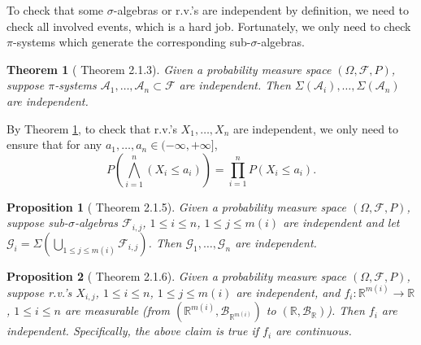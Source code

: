 \documentclass[openany]{book}
\newtheorem{proposition}{Proposition}[chapter]
\newtheorem{theorem}{Theorem}[chapter]
\theoremstyle{definition}
\theoremstyle{remark}
\begin{document}
To check that some $\sigma$-algebras or r.v.'s are independent by definition, we need to check all involved events, which is a hard job. Fortunately, we only need to check $\pi$-systems which generate the corresponding sub-$\sigma$-algebras.
\begin{theorem}[\cite{D10} Theorem 2.1.3]\label{thm:indepPiSystems}
    Given a probability measure space $(\Omega,\mathcal{F},P)$, suppose $\pi$-systems $\mathcal{A}_1,\ldots,\mathcal{A}_n\subset \mathcal{F}$ are independent. Then $\Sigma(\mathcal{A}_i),\ldots,\Sigma(\mathcal{A}_n)$ are independent.
\end{theorem}
By Theorem \ref{thm:indepPiSystems}, to check that r.v.'s $X_1,\ldots,X_n$ are independent, we only need to ensure that for any $a_1,\ldots,a_n\in(-\infty,+\infty]$,
\begin{equation*}
    P\left(\bigwedge_{i=1}^n(X_i\le a_i)\right)=\prod_{i=1}^n P(X_i\le a_i).
\end{equation*}
\begin{proposition}[\cite{D10} Theorem 2.1.5]
    Given a probability measure space $(\Omega,\mathcal{F},P)$, suppose sub-$\sigma$-algebras $\mathcal{F}_{i,j}$, $1\le i\le n$, $1\le j\le m(i)$ are independent and let $\mathcal{G}_i=\Sigma\left(\bigcup_{1\le j\le m(i)} \mathcal{F}_{i,j}\right)$. Then $\mathcal{G}_1,\ldots,\mathcal{G}_n$ are independent.
\end{proposition}
\begin{proposition}[\cite{D10} Theorem 2.1.6]
    Given a probability measure space $(\Omega,\mathcal{F},P)$, suppose r.v.'s $X_{i,j}$, $1\le i\le n$, $1\le j\le m(i)$ are independent, and $f_i:\mathbb{R}^{m(i)}\to \mathbb{R}$, $1\le i\le n$ are measurable (from $(\mathbb{R}^{m(i)},\mathcal{B}_{\mathbb{R}^{m(i)}})$ to $(\mathbb{R},\mathcal{B}_{\mathbb{R}})$). Then $f_i$ are independent. Specifically, the above claim is true if $f_i$ are continuous.
\end{proposition}
\end{document}
